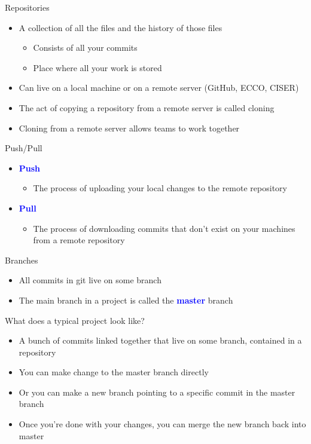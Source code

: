 \documentclass[11pt]{beamer}
\begin{document}
\begin{frame}{Repositories}\label{repo}
\begin{itemize}
	\item
	A collection of all the files and the history of those files
	\begin{itemize}
		\item Consists of all your commits
		\item Place where all your work is stored		
	\end{itemize}
	\item	
	Can live on a local machine or on a remote server (GitHub, ECCO, CISER)
	\item	
	The act of copying a repository from a remote server is called cloning
	\item	
	Cloning from a remote server allows teams to work together
\end{itemize}
\end{frame}

\begin{frame}{Push/Pull}\label{push}
\begin{itemize}
	\item 
	\textcolor{blue}{\textbf{Push}}
	\begin{itemize}
		\item
		The process of uploading your local changes to the remote repository
	\end{itemize}
	\item 
	\textcolor{blue}{\textbf{Pull}}
	\begin{itemize}
		\item
		The process of downloading commits that don't exist on your machines from a remote repository
	\end{itemize}
\end{itemize}
\end{frame}

\begin{frame}{Branches}\label{branch}
\begin{itemize}
	\item
	All commits in git live on some branch
	\item
	The main branch in a project is called the \textcolor{blue}{\textbf{master}} branch
\end{itemize}
\end{frame}

\begin{frame}{What does a typical project look like?}
\begin{itemize}
	\item
	A bunch of commits linked together that live on some branch, contained in a repository
	\item
	You can make change to the master branch directly
	\item
	Or you can make a new branch pointing to a specific commit in the master branch
	\item
	Once you're done with your changes, you can merge the new branch back into master
\end{itemize}
\end{frame}
\end{document}
